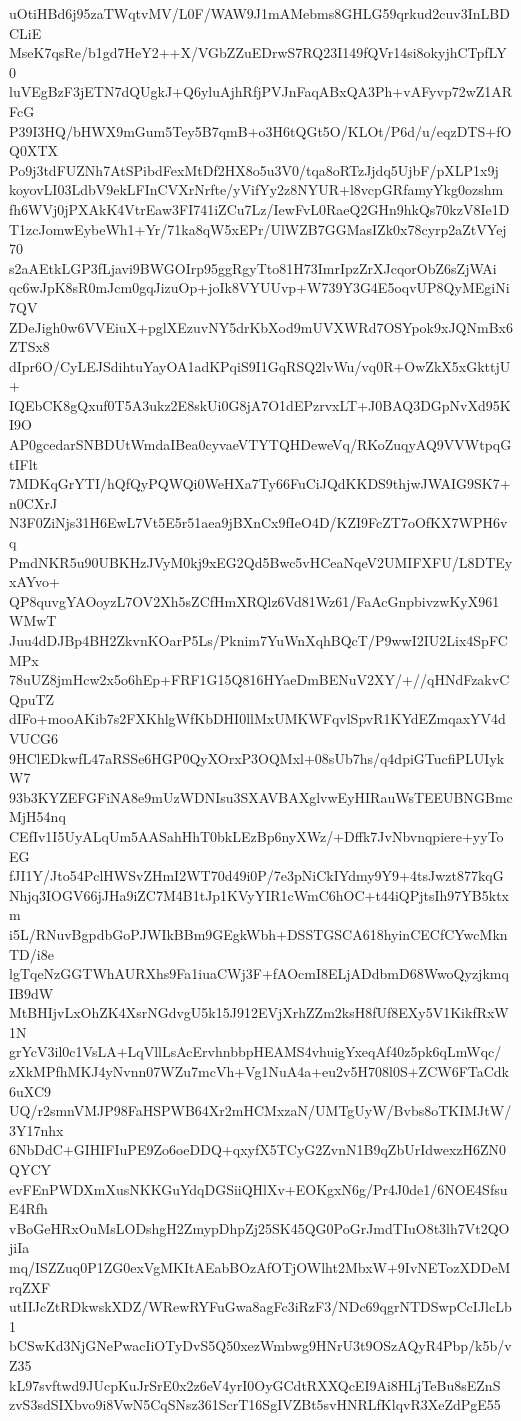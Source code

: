 uOtiHBd6j95zaTWqtvMV/L0F/WAW9J1mAMebms8GHLG59qrkud2cuv3InLBDCLiE
MseK7qsRe/b1gd7HeY2++X/VGbZZuEDrwS7RQ23I149fQVr14si8okyjhCTpfLY0
luVEgBzF3jETN7dQUgkJ+Q6yluAjhRfjPVJnFaqABxQA3Ph+vAFyvp72wZ1ARFcG
P39I3HQ/bHWX9mGum5Tey5B7qmB+o3H6tQGt5O/KLOt/P6d/u/eqzDTS+fOQ0XTX
Po9j3tdFUZNh7AtSPibdFexMtDf2HX8o5u3V0/tqa8oRTzJjdq5UjbF/pXLP1x9j
koyovLI03LdbV9ekLFInCVXrNrfte/yVifYy2z8NYUR+l8vcpGRfamyYkg0ozshm
fh6WVj0jPXAkK4VtrEaw3FI741iZCu7Lz/IewFvL0RaeQ2GHn9hkQs70kzV8Ie1D
T1zcJomwEybeWh1+Yr/71ka8qW5xEPr/UlWZB7GGMasIZk0x78cyrp2aZtVYej70
s2aAEtkLGP3fLjavi9BWGOIrp95ggRgyTto81H73ImrIpzZrXJcqorObZ6sZjWAi
qc6wJpK8sR0mJcm0gqJizuOp+joIk8VYUUvp+W739Y3G4E5oqvUP8QyMEgiNi7QV
ZDeJigh0w6VVEiuX+pglXEzuvNY5drKbXod9mUVXWRd7OSYpok9xJQNmBx6ZTSx8
dIpr6O/CyLEJSdihtuYayOA1adKPqiS9I1GqRSQ2lvWu/vq0R+OwZkX5xGkttjU+
IQEbCK8gQxuf0T5A3ukz2E8skUi0G8jA7O1dEPzrvxLT+J0BAQ3DGpNvXd95KI9O
AP0gcedarSNBDUtWmdaIBea0cyvaeVTYTQHDeweVq/RKoZuqyAQ9VVWtpqGtIFlt
7MDKqGrYTI/hQfQyPQWQi0WeHXa7Ty66FuCiJQdKKDS9thjwJWAIG9SK7+n0CXrJ
N3F0ZiNjs31H6EwL7Vt5E5r51aea9jBXnCx9fIeO4D/KZI9FcZT7oOfKX7WPH6vq
PmdNKR5u90UBKHzJVyM0kj9xEG2Qd5Bwc5vHCeaNqeV2UMIFXFU/L8DTEyxAYvo+
QP8quvgYAOoyzL7OV2Xh5sZCfHmXRQlz6Vd81Wz61/FaAcGnpbivzwKyX961WMwT
Juu4dDJBp4BH2ZkvnKOarP5Ls/Pknim7YuWnXqhBQcT/P9wwI2IU2Lix4SpFCMPx
78uUZ8jmHcw2x5o6hEp+FRF1G15Q816HYaeDmBENuV2XY/+//qHNdFzakvCQpuTZ
dIFo+mooAKib7s2FXKhlgWfKbDHI0llMxUMKWFqvlSpvR1KYdEZmqaxYV4dVUCG6
9HClEDkwfL47aRSSe6HGP0QyXOrxP3OQMxl+08sUb7hs/q4dpiGTucfiPLUIykW7
93b3KYZEFGFiNA8e9mUzWDNIsu3SXAVBAXglvwEyHIRauWsTEEUBNGBmcMjH54nq
CEfIv1I5UyALqUm5AASahHhT0bkLEzBp6nyXWz/+Dffk7JvNbvnqpiere+yyToEG
fJI1Y/Jto54PclHWSvZHmI2WT70d49i0P/7e3pNiCkIYdmy9Y9+4tsJwzt877kqG
Nhjq3IOGV66jJHa9iZC7M4B1tJp1KVyYIR1cWmC6hOC+t44iQPjtsIh97YB5ktxm
i5L/RNuvBgpdbGoPJWIkBBm9GEgkWbh+DSSTGSCA618hyinCECfCYwcMknTD/i8e
lgTqeNzGGTWhAURXhs9Fa1iuaCWj3F+fAOcmI8ELjADdbmD68WwoQyzjkmqIB9dW
MtBHIjvLxOhZK4XsrNGdvgU5k15J912EVjXrhZZm2ksH8fUf8EXy5V1KikfRxW1N
grYcV3il0c1VsLA+LqVllLsAcErvhnbbpHEAMS4vhuigYxeqAf40z5pk6qLmWqc/
zXkMPfhMKJ4yNvnn07WZu7mcVh+Vg1NuA4a+eu2v5H708l0S+ZCW6FTaCdk6uXC9
UQ/r2smnVMJP98FaHSPWB64Xr2mHCMxzaN/UMTgUyW/Bvbs8oTKIMJtW/3Y17nhx
6NbDdC+GIHIFIuPE9Zo6oeDDQ+qxyfX5TCyG2ZvnN1B9qZbUrIdwexzH6ZN0QYCY
evFEnPWDXmXusNKKGuYdqDGSiiQHlXv+EOKgxN6g/Pr4J0de1/6NOE4SfsuE4Rfh
vBoGeHRxOuMsLODshgH2ZmypDhpZj25SK45QG0PoGrJmdTIuO8t3lh7Vt2QOjiIa
mq/ISZZuq0P1ZG0exVgMKItAEabBOzAfOTjOWlht2MbxW+9IvNETozXDDeMrqZXF
utIIJcZtRDkwskXDZ/WRewRYFuGwa8agFc3iRzF3/NDc69qgrNTDSwpCcIJlcLb1
bCSwKd3NjGNePwacIiOTyDvS5Q50xezWmbwg9HNrU3t9OSzAQyR4Pbp/k5b/vZ35
kL97svftwd9JUcpKuJrSrE0x2z6eV4yrI0OyGCdtRXXQcEI9Ai8HLjTeBu8sEZnS
zvS3sdSIXbvo9i8VwN5CqSNsz361ScrT16SgIVZBt5svHNRLfKlqvR3XeZdPgE55
